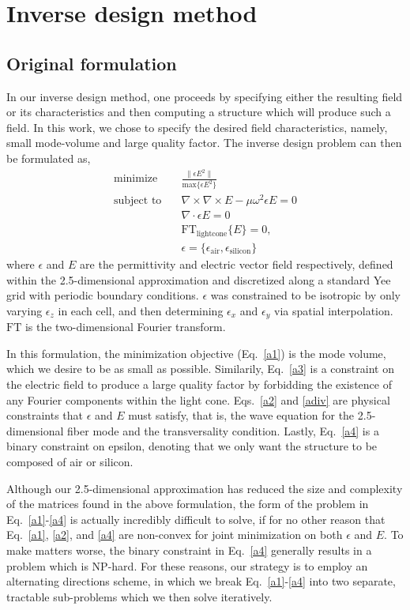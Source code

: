 \section{Inverse design method}
\subsection{Original formulation}
In our inverse design method, one proceeds by specifying either the resulting field or its characteristics and then computing a structure which will produce such a field. In this work, we chose to specify the desired field characteristics, namely, small mode-volume and large quality factor. The inverse design problem can then be formulated as,
\begin{align}
\text{minimize} \quad& \frac{\|\epsilon E^2\|}{\text{max}\{\epsilon E^2\}} \label{a1}\\ 
\text{subject to} \quad 
    & \nabla\times\nabla\times E - \mu\omega^2\epsilon E = 0 \label{a2}\\
    & \nabla\cdot\epsilon E = 0 \label{adiv}\\
    & \text{FT}_\text{lightcone}\{E\} = 0, \label{a3} \\
    & \epsilon = \{\epsilon_\text{air}, \epsilon_\text{silicon}\} \label{a4}
\end{align}
where $\epsilon$ and $E$ are the permittivity and electric vector field respectively, defined within the 2.5-dimensional approximation and discretized along a standard Yee grid\cite{yee} with periodic boundary conditions. $\epsilon$ was constrained to be isotropic by only varying $\epsilon_z$ in each cell, and then determining $\epsilon_x$ and $\epsilon_y$ via spatial interpolation. $\text{FT}$ is the two-dimensional Fourier transform.

In this formulation, the minimization objective (Eq.~\ref{a1}) is the mode volume, which we desire to be as small as possible. Similarily, Eq.~\ref{a3} is a constraint on the electric field to produce a large quality factor by forbidding the existence of any Fourier components within the light cone. Eqs.~\ref{a2} and \ref{adiv} are physical constraints that $\epsilon$ and $E$ must satisfy, that is, the wave equation for the 2.5-dimensional fiber mode and the transversality condition. Lastly, Eq.~\ref{a4} is a binary constraint on epsilon, denoting that we only want the structure to be composed of air or silicon.

Although our 2.5-dimensional approximation has reduced the size and complexity of the matrices found in the above formulation, the form of the problem in Eq.~\ref{a1}-\ref{a4} is actually incredibly difficult to solve, if for no other reason that Eq.~\ref{a1}, \ref{a2}, and \ref{a4} are non-convex\cite{boydbook} for joint minimization on both $\epsilon$ and $E$. To make matters worse, the binary constraint in Eq.~\ref{a4} generally results in a problem which is NP-hard\cite{boydbook}. For these reasons, our strategy is to employ an alternating directions scheme\cite{altdir}, in which we break Eq.~\ref{a1}-\ref{a4} into two separate, tractable sub-problems which we then solve iteratively.

